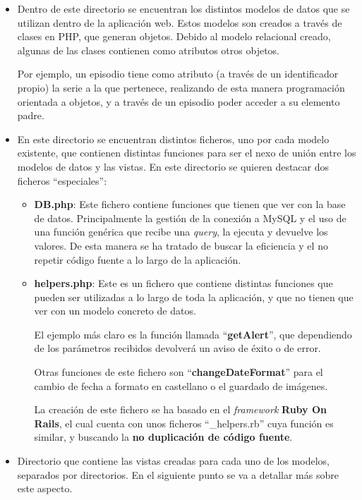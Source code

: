 \documentclass{\ClassPath/viu-tfm-template}
\begin{document}
\vspace{-1em}
\begin{itemize}
    \item {} Dentro de este directorio se encuentran los distintos modelos de datos que se utilizan dentro de la aplicación web. Estos modelos son creados a través de clases en PHP, que generan objetos. Debido al modelo relacional creado, algunas de las clases contienen como atributos otros objetos.

    Por ejemplo, un episodio tiene como atributo (a través de un identificador propio) la serie a la que pertenece, realizando de esta manera programación orientada a objetos, y a través de un episodio poder acceder a su elemento padre.

    \item {} En este directorio se encuentran distintos ficheros, uno por cada modelo existente, que contienen distintas funciones para ser el nexo de unión entre los modelos de datos y las vistas. En este directorio se quieren destacar dos ficheros “especiales”:
    \begin{itemize}
        \item \textbf{DB.php}: Este fichero contiene funciones que tienen que ver con la base de datos. Principalmente la gestión de la conexión a MySQL y el uso de una función genérica que recibe una \textit{query}, la ejecuta y devuelve los valores. De esta manera se ha tratado de buscar la eficiencia y el no repetir código fuente a lo largo de la aplicación.

        \item \textbf{helpers.php}: Este es un fichero que contiene distintas funciones que pueden ser utilizadas a lo largo de toda la aplicación, y que no tienen que ver con un modelo concreto de datos.

        El ejemplo más claro es la función llamada “\textbf{getAlert}”, que dependiendo de los parámetros recibidos devolverá un aviso de éxito o de error.

        Otras funciones de este fichero son “\textbf{changeDateFormat}” para el cambio de fecha a formato en castellano o el guardado de imágenes.

        La creación de este fichero se ha basado en el \textit{framework} \textbf{Ruby On Rails}, el cual cuenta con unos ficheros “\_helpers.rb” cuya función es similar, y buscando la \textbf{no duplicación de código fuente}.
    \end{itemize}

    \item {} Directorio que contiene las vistas creadas para cada uno de los modelos, separados por directorios. En el siguiente punto se va a detallar más sobre este aspecto.
\end{itemize}
\end{document}
